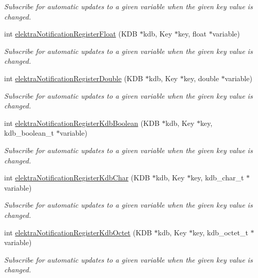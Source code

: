 \begin{DoxyCompactItemize}
\begin{DoxyCompactList}\small\item\em Subscribe for automatic updates to a given variable when the given key value is changed. \end{DoxyCompactList}\item 
int \hyperlink{group__kdbnotification_gad4edf91428d39b3255dffd4b01bc0754}{elektra\+Notification\+Register\+Float} (K\+DB $\ast$kdb, Key $\ast$key, float $\ast$variable)
\begin{DoxyCompactList}\small\item\em Subscribe for automatic updates to a given variable when the given key value is changed. \end{DoxyCompactList}\item 
int \hyperlink{group__kdbnotification_ga03367f9caa0b6cce1579bc5d690729f4}{elektra\+Notification\+Register\+Double} (K\+DB $\ast$kdb, Key $\ast$key, double $\ast$variable)
\begin{DoxyCompactList}\small\item\em Subscribe for automatic updates to a given variable when the given key value is changed. \end{DoxyCompactList}\item 
int \hyperlink{group__kdbnotification_gae6546ac973124e44c456f945086b6c3a}{elektra\+Notification\+Register\+Kdb\+Boolean} (K\+DB $\ast$kdb, Key $\ast$key, kdb\+\_\+boolean\+\_\+t $\ast$variable)
\begin{DoxyCompactList}\small\item\em Subscribe for automatic updates to a given variable when the given key value is changed. \end{DoxyCompactList}\item 
int \hyperlink{group__kdbnotification_ga3a7d85507eb0afcdbf2598b9bf03b819}{elektra\+Notification\+Register\+Kdb\+Char} (K\+DB $\ast$kdb, Key $\ast$key, kdb\+\_\+char\+\_\+t $\ast$variable)
\begin{DoxyCompactList}\small\item\em Subscribe for automatic updates to a given variable when the given key value is changed. \end{DoxyCompactList}\item 
int \hyperlink{group__kdbnotification_ga5f969cbf9fc58f199c91d03d2bed8e56}{elektra\+Notification\+Register\+Kdb\+Octet} (K\+DB $\ast$kdb, Key $\ast$key, kdb\+\_\+octet\+\_\+t $\ast$variable)
\begin{DoxyCompactList}\small\item\em Subscribe for automatic updates to a given variable when the given key value is changed. \end{DoxyCompactList}\item 

\end{DoxyCompactItemize}
